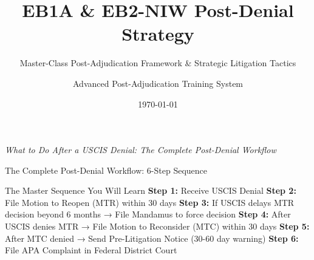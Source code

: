 \documentclass[11pt]{beamer}
\title{EB1A \& EB2-NIW Post-Denial Strategy}
\subtitle{Master-Class Post-Adjudication Framework \& Strategic Litigation Tactics}
\author{Advanced Post-Adjudication Training System}
\date{\today}
\begin{document}
	
	\begin{frame}
		\titlepage
		\centering
		\scriptsize \textit{What to Do After a USCIS Denial: The Complete Post-Denial Workflow}
	\end{frame}
	
	
	\begin{frame}{The Complete Post-Denial Workflow: 6-Step Sequence}
		\scriptsize
		\begin{block}{The Master Sequence You Will Learn}
			\textbf{Step 1:} Receive USCIS Denial
			\vspace{0.1cm}
			\textbf{Step 2:} File Motion to Reopen (MTR) within 30 days
			\vspace{0.1cm}
			\textbf{Step 3:} If USCIS delays MTR decision beyond 6 months → File Mandamus to force decision
			\vspace{0.1cm}
			\textbf{Step 4:} After USCIS denies MTR → File Motion to Reconsider (MTC) within 30 days
			\vspace{0.1cm}
			\textbf{Step 5:} After MTC denied → Send Pre-Litigation Notice (30-60 day warning)
			\vspace{0.1cm}
			\textbf{Step 6:} File APA Complaint in Federal District Court
		\end{block}
	\end{frame}
	
\end{document}
